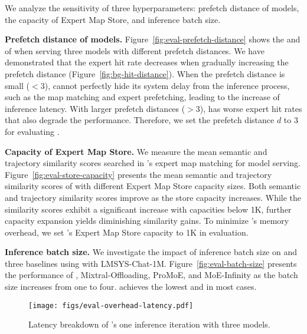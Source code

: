 We analyze the sensitivity of three hyperparameters: prefetch distance of \MoE models, the capacity of Expert Map Store, and inference batch size.


\textbf{Prefetch distance of \MoE models.}
Figure~\ref{fig:eval-prefetch-distance} shows the \TTFT and \TPOT of \sys when serving three \MoE models with different prefetch distances.
%
We have demonstrated that the expert hit rate decreases when gradually increasing the prefetch distance (Figure~\ref{fig:bg-hit-distance}).
%
When the prefetch distance is small ($<3$), \sys cannot perfectly hide its system delay from the inference process, such as the map matching and expert prefetching, leading to the increase of inference latency.
%
With larger prefetch distances ($>3$), \sys has worse expert hit rates that also degrade the performance. 
Therefore, we set the prefetch distance $d$ to 3 for evaluating \sys.


\textbf{Capacity of Expert Map Store.}
We measure the mean semantic and trajectory similarity scores searched in \sys's expert map matching for \MoE model serving.
%
Figure~\ref{fig:eval-store-capacity} presents the mean semantic and trajectory similarity scores of \sys with different Expert Map Store capacity sizes.
%
Both semantic and trajectory similarity scores improve as the store capacity increases.
%
While the similarity scores exhibit a significant increase with capacities below 1K, further capacity expansion yields diminishing similarity gains. 
To minimize \sys's memory overhead, we set \sys's Expert Map Store capacity to 1K in evaluation.


\textbf{Inference batch size.}
We investigate the impact of inference batch size on \sys and three baselines using \mixtral with LMSYS-Chat-1M.
%
Figure~\ref{fig:eval-batch-size} presents the performance of \sys, Mixtral-Offloading, ProMoE, and MoE-Infinity as the batch size increases from one to four. \sys achieves the lowest \TTFT and \TPOT in most cases.






\begin{figure}[t]
  \centering
  \texttt{[image: figs/eval-overhead-latency.pdf]}
  \vspace{-0.15in}
  \caption{Latency breakdown of \sys's one inference iteration with three \MoE models.}
  \vspace{-0.1in}
  \label{fig:eval-overhead-latency.pdf}
\end{figure}





